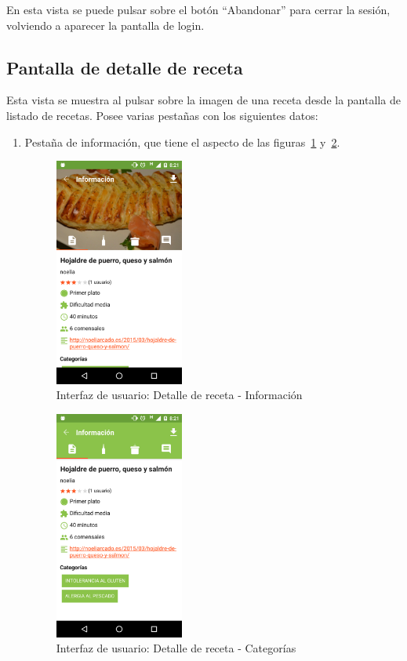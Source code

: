 En esta vista se puede pulsar sobre el botón ``Abandonar'' para cerrar la sesión,
volviendo a aparecer la pantalla de login.


\subsection{Pantalla de detalle de receta}

Esta vista se muestra al pulsar sobre la imagen de una receta desde la pantalla
de listado de recetas. Posee varias pestañas con los siguientes datos:
\begin{enumerate}
\item Pestaña de información, que tiene el aspecto de las
  figuras~\ref{fig:captura_08} y~\ref{fig:captura_09}.

  
  \begin{figure}[htbp]
    \centering
    \includegraphics[width=0.4\textwidth]{cap5/img/captura_08}
    \caption{Interfaz de usuario: Detalle de receta - Información}
    \label{fig:captura_08}
  \end{figure}

  \begin{figure}[htbp]
    \centering
    \includegraphics[width=0.4\textwidth]{cap5/img/captura_09}
    \caption{Interfaz de usuario: Detalle de receta - Categorías}
    \label{fig:captura_09}
  \end{figure}


\end{enumerate}
